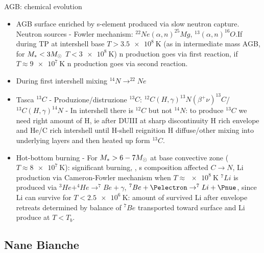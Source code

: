 \begin{frame}{AGB: chemical evolution}
    \begin{itemize}
            \item AGB surface enriched by s-element produced via slow neutron capture. Neutron sources - Fowler mechanism: $^{22}Ne(\alpha,n)^{25}Mg$, $^{13}(\alpha,n)^{16}O$.If during TP at intershell base $T>\SI{3.5e8}{\kelvin}$ (as in intermediate mass AGB, for $M_*<3M_{\odot}{}$ $T<\SI{3e8}{\kelvin}$) n production goes via first reaction, if $T\approx\SI{9e7}{\kelvin}$ n production goes via second reaction.

                \item During first intershell mixing $^{14}N\to^{22}Ne$
                \item Tasca $^{13}C$ - Produzione/distruzione $^{13}C$: $^{12}C(H,\gamma)^{13}N(\beta^+\nu)^{13}C$/$^{13}C(H,\gamma)^{14}N$ - In intershell there is $^{12}C$ but not $^{14}N$: to produce $^{13}C$ we need right amount of H, ie after DUIII at sharp discontinuity H rich envelope and He/C rich intershell until H-shell reignition H diffuse/other mixing  into underlying layers and then heated up form $^{13}C$.
                \item Hot-bottom burning - For $M_*>6-7M_{\odot}{}$ at base convective zone ($T\approx\SI{8e7}{\kelvin}$): significant burning, , s composition affected $C\to N$, Li production via Cameron-Fowler mechanism when $T\approx\SI{e8}{\kelvin}$ $^7Li$ is produced via $^3He+^4He\to^7Be+\gamma$, $^7Be+\Pelectron\to^7Li+\Pnue$, since Li can survive for $T<\SI{2.5e6}{\kelvin}$: amount of survived Li after envelope retreats determined by balance of $^7Be$ transported toward surface and Li produce at $T<T_b$.
        \end{itemize}
\end{frame}

\subsection{Nane Bianche}

